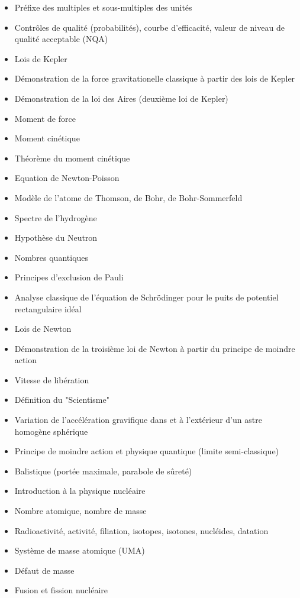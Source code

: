 \begin{itemize}
\begin{itemize}[noitemsep]
				\item Préfixe des multiples et sous-multiples des unités
				\item Contrôles de qualité (probabilités), courbe d'efficacité, valeur de niveau de qualité acceptable (NQA)
				\item Lois de Kepler
				\item Démonstration de la force gravitationelle classique à partir des lois de Kepler
				\item Démonstration de la loi des Aires (deuxième loi de Kepler)
				\item Moment de force
				\item Moment cinétique
				\item Théorème du moment cinétique
				\item Equation de Newton-Poisson
				\item Modèle de l'atome de Thomson, de Bohr, de Bohr-Sommerfeld
				\item Spectre de l'hydrogène
				\item Hypothèse du Neutron
				\item Nombres quantiques
				\item Principes d'exclusion de Pauli
				\item Analyse classique de l'équation de Schrödinger pour le puits de potentiel rectangulaire idéal
				\item Lois de Newton
				\item Démonstration de la troisième loi de Newton à partir du principe de moindre action
				\item Vitesse de libération
				\item Définition du "Scientisme"
				\item Variation de l'accélération gravifique dans et à l'extérieur d'un astre homogène sphérique
				\item Principe de moindre action et physique quantique (limite semi-classique)
				\item Balistique (portée maximale, parabole de sûreté)
				\item Introduction à la physique nucléaire
				\item Nombre atomique, nombre de masse
				\item Radioactivité, activité, filiation, isotopes, isotones, nucléides, datation
				\item Système de masse atomique (UMA)
				\item Défaut de masse
				\item Fusion et fission nucléaire

\end{itemize}
\end{itemize}
